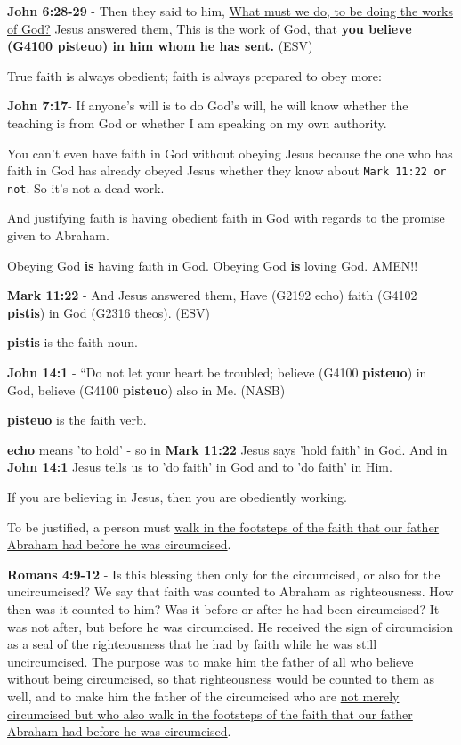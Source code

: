 \documentclass[11pt]{article}
\begin{document}
\textbf{John 6:28-29} - Then they said to him, \uline{What must we do, to be doing the works of God?} Jesus answered them, This is the work of God, that \textbf{you believe (G4100 pisteuo) in him whom he has sent.} (ESV)

True faith is always obedient; faith is always prepared to obey more:

\textbf{John 7:17}- If anyone's will is to do God's will, he will know whether the teaching is from God or whether I am speaking on my own authority.

You can't even have faith in God without obeying Jesus because the one who has faith in God has already obeyed Jesus whether they know about \texttt{Mark 11:22 or not}. So it's not a dead work.

And justifying faith is having obedient faith in God with regards to the promise given to Abraham.

Obeying God \textbf{is} having faith in God. Obeying God \textbf{is} loving God. AMEN!!

\textbf{Mark 11:22} - And Jesus answered them, Have (G2192 echo) faith (G4102 \textbf{pistis}) in God (G2316 theos). (ESV)

\textbf{pistis} is the faith noun.

\textbf{John 14:1} - “Do not let your heart be troubled; believe (G4100 \textbf{pisteuo}) in God, believe (G4100 \textbf{pisteuo}) also in Me. (NASB)

\textbf{pisteuo} is the faith verb.

\textbf{echo} means 'to hold' - so in \textbf{Mark 11:22} Jesus says 'hold faith' in God.
And in \textbf{John 14:1} Jesus tells us to 'do faith' in God and to 'do faith' in Him.

If you are believing in Jesus, then you are obediently working.

To be justified, a person must \uline{walk in the footsteps of the faith that our father Abraham had before he was circumcised}.

\textbf{Romans 4:9-12} - Is this blessing then only for the circumcised, or also for the uncircumcised? We say that faith was counted to Abraham as righteousness. How then was it counted to him? Was it before or after he had been circumcised? It was not after, but before he was circumcised. He received the sign of circumcision as a seal of the righteousness that he had by faith while he was still uncircumcised. The purpose was to make him the father of all who believe without being circumcised, so that righteousness would be counted to them as well, and to make him the father of the circumcised who are \uline{not merely circumcised but who also walk in the footsteps of the faith that our father Abraham had before he was circumcised}.
\end{document}
